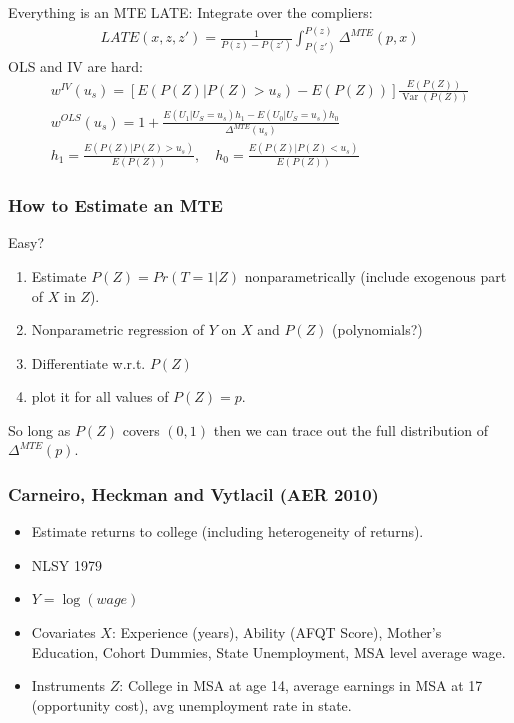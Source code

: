 \documentclass[xcolor=pdftex,dvipsnames,table,mathserif,aspectratio=169]{beamer}
\begin{document}
\begin{frame}{Everything is an MTE}
LATE: Integrate over the compliers:
\begin{eqnarray*}
LATE(x,z,z')= \frac{1}{P(z) - P(z')} \int_{P(z')}^{P(z)} \Delta^{MTE}(p,x) 
\end{eqnarray*}
OLS and IV are hard:
\begin{align*}
w^{I V}\left(u_{s}\right)=\left[E\left(P(Z) | P(Z)>u_{s}\right)-E(P(Z))\right] \frac{E(P(Z))}{\operatorname{Var}(P(Z))}\\
w^{O L S}\left(u_{s}\right)=1+\frac{E\left(U_{1} | U_{S}=u_{s}\right) h_{1}-E\left(U_{0} | U_{S}=u_{s}\right) h_{0}}{\Delta^{M T E}\left(u_{s}\right)}\\
h_{1}=\frac{E\left(P(Z) | P(Z)>u_{s}\right)}{ E(P(Z))}, \quad h_{0}=\frac{E\left(P(Z) | P(Z)<u_{s}\right)}{E(P(Z))}
\end{align*}


\end{frame}


\begin{frame}
\frametitle{How to Estimate an MTE}
Easy?
\begin{enumerate}
\item Estimate $P(Z) = Pr(T=1 | Z)$ nonparametrically (include exogenous part of $X$ in $Z$).
\item Nonparametric regression of $Y$ on $X$ and $P(Z)$ (polynomials?)
\item Differentiate w.r.t. $P(Z)$
\item plot it for all values of $P(Z)=p$.
\end{enumerate}
So long as $P(Z)$ covers $(0,1)$ then we can trace out the full distribution of $\Delta^{MTE}(p)$.
\end{frame}



\begin{frame}
\frametitle{Carneiro, Heckman and Vytlacil (AER 2010)}
\begin{itemize}
\item Estimate returns to college (including heterogeneity of returns).
\item NLSY 1979
\item $Y = \log(wage)$
\item Covariates $X$: Experience (years), Ability (AFQT Score), Mother's Education, Cohort Dummies, State Unemployment, MSA level average wage.
\item Instruments $Z$: College in MSA at age 14, average earnings in MSA at 17 (opportunity cost), avg unemployment rate in state.
\end{itemize}
\end{frame}
\end{document}
